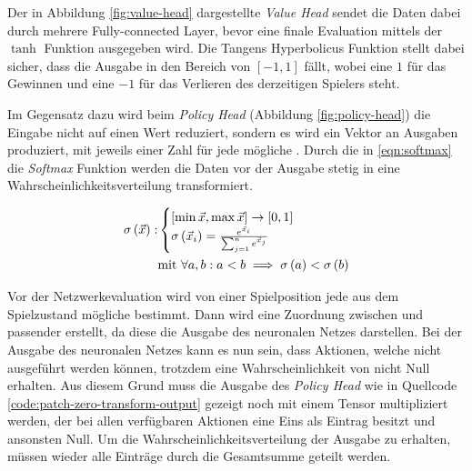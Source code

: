 Der in Abbildung \ref{fig:value-head} dargestellte \emph{Value Head} sendet die Daten dabei durch mehrere Fully-connected Layer, bevor eine finale Evaluation mittels der $\tanh$ Funktion ausgegeben wird. Die Tangens Hyperbolicus Funktion stellt dabei sicher, dass die Ausgabe in den Bereich von $\left[-1,1\right]$ fällt, wobei eine $1$ für das Gewinnen und eine $-1$ für das Verlieren des derzeitigen Spielers steht.

\pagebreak

Im Gegensatz dazu wird beim \emph{Policy Head} (Abbildung \ref{fig:policy-head}) die Eingabe nicht auf einen Wert reduziert, sondern es wird ein Vektor an Ausgaben produziert, mit jeweils einer Zahl für jede mögliche \hyperref[text:natural-action-id]{}. Durch die in \ref{eqn:softmax} die \emph{Softmax} Funktion werden die Daten vor der Ausgabe stetig in eine Wahrscheinlichkeitsverteilung transformiert.

\vspace*{-0.5cm}
\begin{align}
    \label{eqn:softmax}
    \sigma\left(\vec{x}\right): & \begin{cases}
        [\min \vec{x}, \max \vec{x}] \to \left[0,1\right] \\
        \sigma\left(\vec{x}_i\right)= \frac{e^{\vec{x}_i}}{\sum_{j=1}^n e^{\vec{x}_j}}
        \end{cases} \\
        &   \text{mit } \forall a,b: a<b \implies \sigma\left(a\right) < \sigma\left(b\right) \notag
\end{align}
\vspace*{-1.2cm}

Vor der Netzwerkevaluation wird von einer Spielposition jede aus dem Spielzustand mögliche \hyperref[text:action-id]{} bestimmt. Dann wird eine Zuordnung zwischen \hyperref[text:action-id]{} und passender \hyperref[text:natural-action-id]{} erstellt, da diese die Ausgabe des neuronalen Netzes darstellen. Bei der Ausgabe des neuronalen Netzes kann es nun sein, dass Aktionen, welche nicht ausgeführt werden können, trotzdem eine Wahrscheinlichkeit von nicht Null erhalten. Aus diesem Grund muss die Ausgabe des \emph{Policy Head} wie in Quellcode \ref{code:patch-zero-transform-output} gezeigt noch mit einem Tensor multipliziert werden, der bei allen verfügbaren Aktionen eine Eins als Eintrag besitzt und ansonsten Null. Um die Wahrscheinlichkeitsverteilung der Ausgabe zu erhalten, müssen wieder alle Einträge durch die Gesamtsumme geteilt werden.

